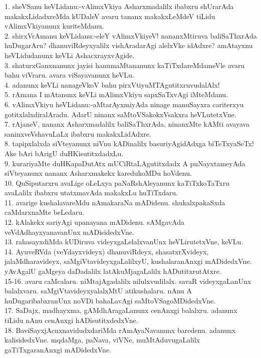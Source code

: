 \documentclass{article}
\begin{document}
1. sheVSanu heVLidanu:-vAlimxVkiya Asharxmadalilx ibabxru shUrarAda makakxLidadxreMda kUDaleV avaru tananx makakxLeMdeV tiLidu vAlimxVkiyanunx kuriteMdanu.\\
2. shirxVrAmanu keVLidanu:-eleY vAlimxVkiyeV! nananxMtiruva baliSaThxrAda huDugarAru? dhanuviRdeyxyalilx vishAradarAgi alelxVke idAdxre? amAtayxnu heVLidudanunx keVLi AshacxrayxvAgide.\\
3. shaturxGanxnanunx jayisi hanumaMtananunx kaTiTxdareMdameVle avaru bahu viVraru. avara viSayavanunx heVLu.\\
4. adanunx keVLi nanageVkoV bahu pirxVtiyuMTAgutitxruvudalAlx!\\
5. rAmana I mAtanunx keVLi mAlimxVkiyu sapxSaTxvAgi iMteMdanu.\\
6. vAlimxVkiyu heVLidanu:-aMtarAyxmiyAda ninage manuSayxra cariterxyu gotitxlalxdiralAradu. AdarU ninanx saMtoVSakokxVsakxra heVLutetxVne.\\
7. rAjaneV, nananx Asharxmadalilx baliSaThxrAda, ninanxMte kAMti avayava saninxveVshavuLaLx ibabxru makakxLidAdxre.\\
8. tapipxlalxda siVteyanunx niVnu kADinalilx basuriyAgidAdxga biTeTxyaSeTx! Ake bAri bArigU duHKisutitxdadxLu.\\
9. kurariyaMte duHKapaDutAtx mUCiRtaLAgutitxdadx A puNayxtameyAda siVteyanunx nananx Asharxmakekx karedukoMDu hoVdenu.\\
10. QuSiputarxru avaLige oLeLxya paNaRshAleyanunx kaTiTxkoTaTxru avaLalilx ibabxru utatxmavAda makakxLu huTiTxdaru.\\
11. avarige kushalavareMdu nAmakaraNa mADidenu. shukalxpakaSxda caMdarxnaMte beLedaru.\\
12. kAlakekx sariyAgi upanayana mADidenu. sAMgavAda veVdAdhayxyanavanUnx mADisidedxVne.\\
13. rahasayxdiMda kUDiruva videyxgaLelalxvanUnx heVLirutetxVne, keVLu.\\
14. AyuveRVda (veYdayxvideyx) dhanuviRdeyx, shasatxrXvideyx, jalaMdharavideyx, saMgiVtavideyxgaLalilxyU, kushalaranAnxgi mADidedxVne. yAvAgalU gaMgeya daDadalilx latAkuMjagaLalilx hADutitxrutAtxre.\\
15-16. avaru caMcalaru. niMtajAgadalilx nilulxvudilalx. savaR videyxgaLanUnx balalxvaru. saMgiVtavideyxyalalxMtU atikushalaru. nAnu A huDugaribabxranUnx noVDi bahaLavAgi saMtoVSagoMDidedxVne.\\
17. SaDajx, madhayxma, gAMdhAragaLanunx cenAnxgi balalxru. adanunx tiLidu nAnu cenAnxgi hADisutitxdedxVne.\\
18. BaviSayxjAcnxnavidudxdariMda rAmAyaNavanunx baredenu. adanunx kalisidedxVne. mqdaMga, paNava, viVNe, muMtAduvugaLalilx gaTiTxgaranAnxgi mADidedxVne.\\
\end{document}
